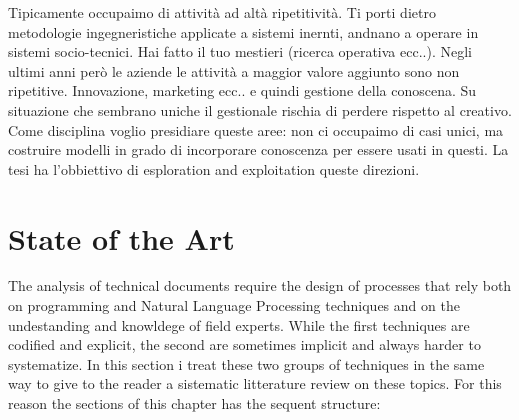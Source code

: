 \documentclass[]{book}
\begin{document}
Tipicamente occupaimo di attività ad altà ripetitività. Ti porti dietro
metodologie ingegneristiche applicate a sistemi inernti, andnano a
operare in sistemi socio-tecnici. Hai fatto il tuo mestieri (ricerca
operativa ecc..). Negli ultimi anni però le aziende le attività a
maggior valore aggiunto sono non ripetitive. Innovazione, marketing
ecc.. e quindi gestione della conoscena. Su situazione che sembrano
uniche il gestionale rischia di perdere rispetto al creativo. Come
disciplina voglio presidiare queste aree: non ci occupaimo di casi
unici, ma costruire modelli in grado di incorporare conoscenza per
essere usati in questi. La tesi ha l'obbiettivo di esploration and
exploitation queste direzioni.

\chapter{State of the Art}\label{sota}

The analysis of technical documents require the design of processes that
rely both on programming and Natural Language Processing techniques and
on the undestanding and knowldege of field experts. While the first
techniques are codified and explicit, the second are sometimes implicit
and always harder to systematize. In this section i treat these two
groups of techniques in the same way to give to the reader a sistematic
litterature review on these topics. For this reason the sections of this
chapter has the sequent structure:
\end{document}
